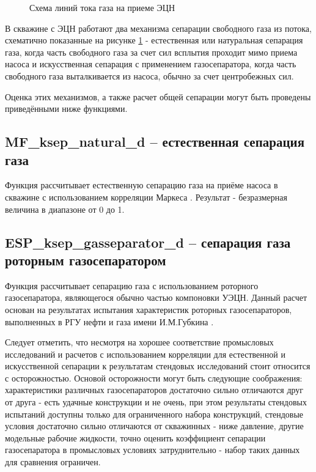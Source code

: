 \begin{figure}[H]
	\centering
		
		\caption{Схема линий тока газа на приеме ЭЦН}
		\label{ris:separation_scheme}
\end{figure}

В скважине с ЭЦН работают два механизма сепарации свободного газа из потока, схематично показанные на рисунке \ref{ris:separation_scheme} - естественная или натуральная сепарация газа, когда часть свободного газа за счет сил всплытия проходит мимо приема насоса и искусственная сепарация с применением газосепаратора, когда часть свободного газа выталкивается из насоса, обычно за счет центробежных сил. 

Оценка этих механизмов, а также расчет общей сепарации могут быть проведены приведёнными ниже функциями.

\subsection{MF\_ksep\_natural\_d – естественная сепарация газа}
Функция рассчитывает естественную сепарацию газа на приёме насоса в скважине с использованием корреляции Маркеса \cite{Marquez_2003} . Результат - безразмерная величина в диапазоне от 0 до 1. 


\subsection{ESP\_ksep\_gasseparator\_d – сепарация газа роторным газосепаратором}
Функция рассчитывает сепарацию газа с использованием роторного газосепаратора, являющегося обычно частью компоновки УЭЦН. Данный расчет основан на результатах испытания характеристик роторных газосепараторов, выполненных в РГУ нефти и газа имени И.М.Губкина \cite{SPE_117415_2008}. 

Следует отметить, что несмотря на хорошее соответствие промысловых исследований и расчетов с использованием корреляции для естественной и искусственной сепарации \cite{SPE_117415_2008} к результатам стендовых исследований стоит относится с осторожностью. Основой осторожности могут быть следующие соображения: характеристики различных газосепараторов достаточно сильно отличаются друг от друга - есть удачные конструкции и не очень, при этом результаты стендовых испытаний доступны только для ограниченного набора конструкций, стендовые условия достаточно сильно отличаются от скважинных - ниже давление, другие модельные рабочие жидкости, точно оценить коэффициент сепарации газосепаратора в промысловых условиях затруднительно - набор таких данных для сравнения ограничен. 

